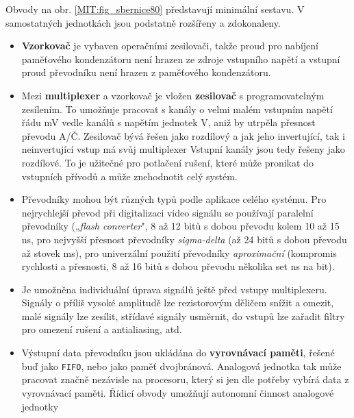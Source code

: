         Obvody na obr. \ref{MIT:fig_sbernice80} představují minimální sestavu. V samostatných 
        jednotkách jsou podstatně rozšířeny a zdokonaleny.
      \begin{itemize}[noitemsep]
        \item \textbf{Vzorkovač} je vybaven operačními zesilovači, takže proud pro nabíjení  
              paměťového kondenzátoru není hrazen ze zdroje vstupního napětí a vstupní proud 
              převodníku není hrazen z paměťového kondenzátoru.
        \item Mezi \textbf{multiplexer} a vzorkovač je vložen \textbf{zesilovač} s programovatelným 
              zesílením. To umožňuje pracovat s kanály o velmi malém vstupním napětí řádu mV vedle 
              kanálů s napětím jednotek V, aniž by utrpěla přesnost převodu A/Č. Zesilovač bývá 
              řešen jako rozdílový a jak jeho invertující, tak i neinvertující vstup má svůj 
              multiplexer Vstupní kanály jsou tedy řešeny jako rozdílové. To je užitečné pro 
              potlačení rušení, které může pronikat do vstupních přívodů a může znehodnotit celý 
              systém.
        \item Převodníky mohou být různých typů podle aplikace celého systému. Pro nejrychlejší 
              převod při  digitalizaci video signálu se používají paralelní převodníky 
              („\emph{flash converter}", 8 až 12 bitů s dobou převodu kolem 10 až 15 ns, pro 
              nejvyšší přesnost převodníky \emph{sigma-delta} (až 24 bitů s dobou převodu až stovek 
              ms), pro univerzální použití převodníky \emph{aproximační} (kompromis rychlosti a 
              přesnosti, 8 až 16 bitů s dobou převodu několika set ns na bit).
        \item Je umožněna individuální úprava signálů ještě před vstupy multiplexeru. Signály o  
              příliš vysoké amplitudě lze rezistorovým děličem snížit a omezit, malé signály lze 
              zesílit, střídavé signály usměrnit, do vstupů lze zařadit filtry pro omezení rušení a 
              antialiasing, atd.
        \item Výstupní data převodníku jsou ukládána do \textbf{vyrovnávací paměti}, řešené buď 
              jako \texttt{FIFO}, nebo jako paměť dvojbránová. Analogová jednotka tak může pracovat 
              značně nezávisle na procesoru, který si jen dle potřeby vybírá data z vyrovnávací 
              paměti. Řídicí obvody umožňují autonomní činnost analogové jednotky       
      \end{itemize}
      

